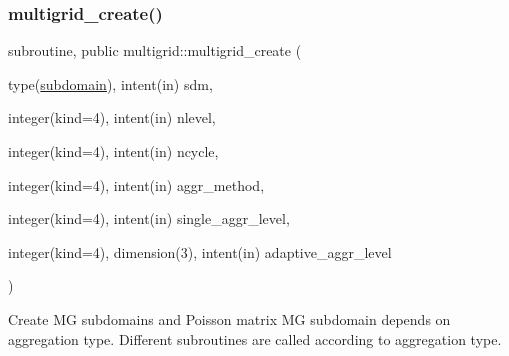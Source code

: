 \subsubsection{\texorpdfstring{multigrid\+\_\+create()}{multigrid\_create()}}
{\footnotesize\ttfamily subroutine, public multigrid\+::multigrid\+\_\+create (\begin{DoxyParamCaption}\item[{type(\hyperlink{structgeometry_1_1subdomain}{subdomain}), intent(in)}]{sdm,  }\item[{integer(kind=4), intent(in)}]{nlevel,  }\item[{integer(kind=4), intent(in)}]{ncycle,  }\item[{integer(kind=4), intent(in)}]{aggr\+\_\+method,  }\item[{integer(kind=4), intent(in)}]{single\+\_\+aggr\+\_\+level,  }\item[{integer(kind=4), dimension(3), intent(in)}]{adaptive\+\_\+aggr\+\_\+level }\end{DoxyParamCaption})}



Create MG subdomains and Poisson matrix  MG subdomain depends on aggregation type. Different subroutines are called according to aggregation type. 


